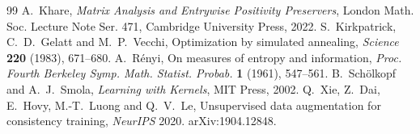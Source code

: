 \documentclass[11pt]{article}
\theoremstyle{remark}
\begin{document}
\begin{thebibliography}{99}
 A.~Khare, \emph{Matrix Analysis and Entrywise Positivity Preservers}, London Math. Soc. Lecture Note Ser. 471, Cambridge University Press, 2022.
 S.~Kirkpatrick, C.~D.~Gelatt and M.~P.~Vecchi, Optimization by simulated annealing, \emph{Science} \textbf{220} (1983), 671--680.
 A.~Rényi, On measures of entropy and information, \emph{Proc. Fourth Berkeley Symp. Math. Statist. Probab.} \textbf{1} (1961), 547--561.
 B.~Schölkopf and A.~J.~Smola, \emph{Learning with Kernels}, MIT Press, 2002.
 Q.~Xie, Z.~Dai, E.~Hovy, M.-T.~Luong and Q.~V.~Le, Unsupervised data augmentation for consistency training, \emph{NeurIPS} 2020. arXiv:1904.12848.
\end{thebibliography}
\end{document}

